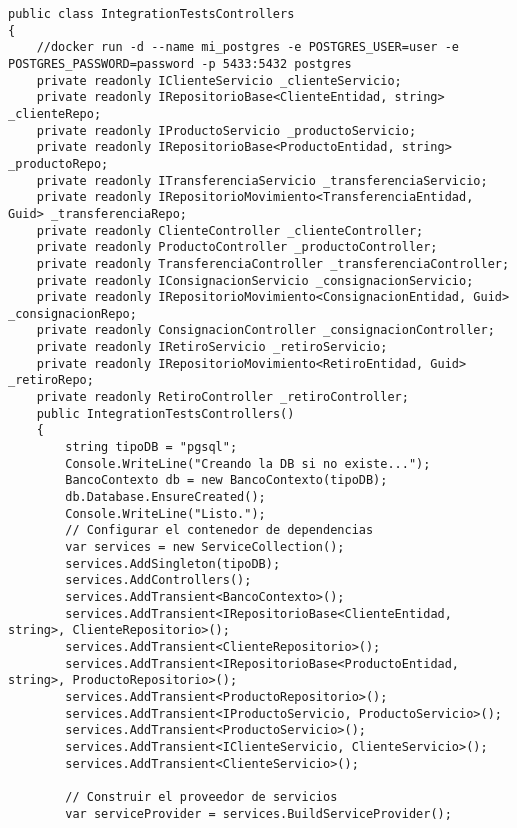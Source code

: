 \documentclass[executivepaper]{article}
\begin{document}
\begin{lstlisting}
public class IntegrationTestsControllers
{
    //docker run -d --name mi_postgres -e POSTGRES_USER=user -e POSTGRES_PASSWORD=password -p 5433:5432 postgres
    private readonly IClienteServicio _clienteServicio;
    private readonly IRepositorioBase<ClienteEntidad, string> _clienteRepo;
    private readonly IProductoServicio _productoServicio;
    private readonly IRepositorioBase<ProductoEntidad, string> _productoRepo;
    private readonly ITransferenciaServicio _transferenciaServicio;
    private readonly IRepositorioMovimiento<TransferenciaEntidad, Guid> _transferenciaRepo;
    private readonly ClienteController _clienteController; 
    private readonly ProductoController _productoController;
    private readonly TransferenciaController _transferenciaController;
    private readonly IConsignacionServicio _consignacionServicio;
    private readonly IRepositorioMovimiento<ConsignacionEntidad, Guid> _consignacionRepo;
    private readonly ConsignacionController _consignacionController;
    private readonly IRetiroServicio _retiroServicio;
    private readonly IRepositorioMovimiento<RetiroEntidad, Guid> _retiroRepo;
    private readonly RetiroController _retiroController;
    public IntegrationTestsControllers()
    {
        string tipoDB = "pgsql";
        Console.WriteLine("Creando la DB si no existe...");
        BancoContexto db = new BancoContexto(tipoDB);
        db.Database.EnsureCreated();
        Console.WriteLine("Listo.");
        // Configurar el contenedor de dependencias
        var services = new ServiceCollection();
        services.AddSingleton(tipoDB);
        services.AddControllers();
        services.AddTransient<BancoContexto>();
        services.AddTransient<IRepositorioBase<ClienteEntidad, string>, ClienteRepositorio>();
        services.AddTransient<ClienteRepositorio>();
        services.AddTransient<IRepositorioBase<ProductoEntidad, string>, ProductoRepositorio>();
        services.AddTransient<ProductoRepositorio>();
        services.AddTransient<IProductoServicio, ProductoServicio>();
        services.AddTransient<ProductoServicio>();
        services.AddTransient<IClienteServicio, ClienteServicio>();
        services.AddTransient<ClienteServicio>();

        // Construir el proveedor de servicios
        var serviceProvider = services.BuildServiceProvider();


\end{lstlisting}
\end{document}

